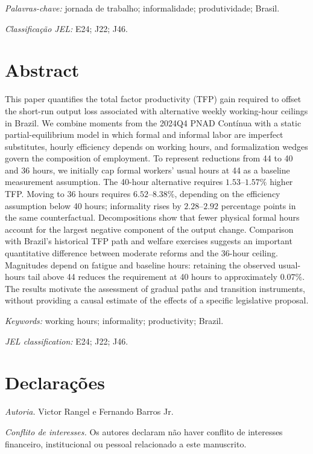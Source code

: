 \documentclass[12pt]{article}
\begin{document}
\textit{Palavras-chave:} jornada de trabalho; informalidade; produtividade; Brasil.

\textit{Classifica\c{c}\~ao JEL:} E24; J22; J46.

\clearpage
{}
\section*{Abstract}

 This paper quantifies the total factor productivity (TFP) gain required to offset the short-run output loss associated with alternative weekly working-hour ceilings in Brazil. We combine moments from the 2024Q4 PNAD Contínua with a static partial-equilibrium model in which formal and informal labor are imperfect substitutes, hourly efficiency depends on working hours, and formalization wedges govern the composition of employment. To represent reductions from 44 to 40 and 36 hours, we initially cap formal workers' usual hours at 44 as a baseline measurement assumption. The 40-hour alternative requires $1.53$--$1.57\%$ higher TFP. Moving to 36 hours requires $6.52$--$8.38\%$, depending on the efficiency assumption below 40 hours; informality rises by $2.28$--$2.92$ percentage points in the same counterfactual. Decompositions show that fewer physical formal hours account for the largest negative component of the output change. Comparison with Brazil's historical TFP path and welfare exercises suggests an important quantitative difference between moderate reforms and the 36-hour ceiling. Magnitudes depend on fatigue and baseline hours: retaining the observed usual-hours tail above 44 reduces the requirement at 40 hours to approximately $0.07\%$. The results motivate the assessment of gradual paths and transition instruments, without providing a causal estimate of the effects of a specific legislative proposal.

\textit{Keywords:} working hours; informality; productivity; Brazil.

\textit{JEL classification:} E24; J22; J46.

\section*{Declara\c{c}\~oes}

\textit{Autoria.} Victor Rangel e Fernando Barros Jr.

\textit{Conflito de interesses.} Os autores declaram n\~ao haver conflito de interesses financeiro, institucional ou pessoal relacionado a este manuscrito.
\end{document}
